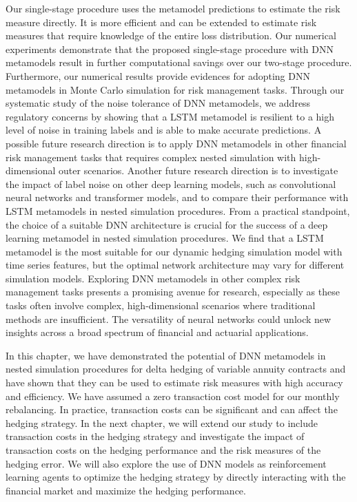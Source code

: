 Our single-stage procedure uses the metamodel predictions to estimate the risk measure directly.
It is more efficient and can be extended to estimate risk measures that require knowledge of the entire loss distribution.
Our numerical experiments demonstrate that the proposed single-stage procedure with DNN metamodels result in further computational savings over our two-stage procedure. 
Furthermore, our numerical results provide evidences for adopting DNN metamodels in Monte Carlo simulation for risk management tasks.
Through our systematic study of the noise tolerance of DNN metamodels, we address regulatory concerns by showing that a LSTM metamodel is resilient to a high level of noise in training labels and is able to make accurate predictions.
A possible future research direction is to apply DNN metamodels in other financial risk management tasks that requires complex nested simulation with high-dimensional outer scenarios.
Another future research direction is to investigate the impact of label noise on other deep learning models, such as convolutional neural networks and transformer models, and to compare their performance with LSTM metamodels in nested simulation procedures. 
From a practical standpoint, the choice of a suitable DNN architecture is crucial for the success of a deep learning metamodel in nested simulation procedures.
We find that a LSTM metamodel is the most suitable for our dynamic hedging simulation model with time series features, but the optimal network architecture may vary for different simulation models.
Exploring DNN metamodels in other complex risk management tasks presents a promising avenue for research, especially as these tasks often involve complex, high-dimensional scenarios where traditional methods are insufficient. 
The versatility of neural networks could unlock new insights across a broad spectrum of financial and actuarial applications.

In this chapter, we have demonstrated the potential of DNN metamodels in nested simulation procedures for delta hedging of variable annuity contracts and have shown that they can be used to estimate risk measures with high accuracy and efficiency.
We have assumed a zero transaction cost model for our monthly rebalancing.
In practice, transaction costs can be significant and can affect the hedging strategy.
In the next chapter, we will extend our study to include transaction costs in the hedging strategy and investigate the impact of transaction costs on the hedging performance and the risk measures of the hedging error.
We will also explore the use of DNN models as reinforcement learning agents to optimize the hedging strategy by directly interacting with the financial market and maximize the hedging performance.